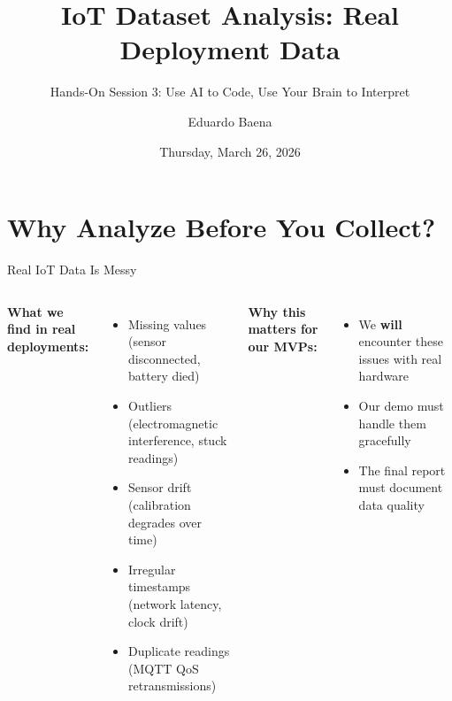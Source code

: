 \documentclass[aspectratio=169,11pt]{beamer}
\title[EECE5155 -- Hands-On 3]{IoT Dataset Analysis: Real Deployment Data}
\subtitle{Hands-On Session 3: Use AI to Code, Use Your Brain to Interpret}
\author{Eduardo Baena}
\date{Thursday, March 26, 2026}
\institute{Northeastern University\\EECE5155: Wireless Sensor Networks and IoT}
\begin{document}
\begin{frame}
    \titlepage
\end{frame}

\section{Why Analyze Before You Collect?}

\begin{frame}[shrink=5]{Real IoT Data Is Messy}
    \begin{columns}
        \textbf{What we find in real deployments:}
        \begin{itemize}
            \item Missing values (sensor disconnected, battery died)
            \item Outliers (electromagnetic interference, stuck readings)
            \item Sensor drift (calibration degrades over time)
            \item Irregular timestamps (network latency, clock drift)
            \item Duplicate readings (MQTT QoS retransmissions)
        \end{itemize}

        \vspace{0.15cm}
        \textbf{Why this matters for our MVPs:}
        \begin{itemize}
            \item We \textbf{will} encounter these issues with real hardware
            \item Our demo must handle them gracefully
            \item The final report must document data quality
        \end{itemize}

\end{columns}
\end{frame}
\end{document}
